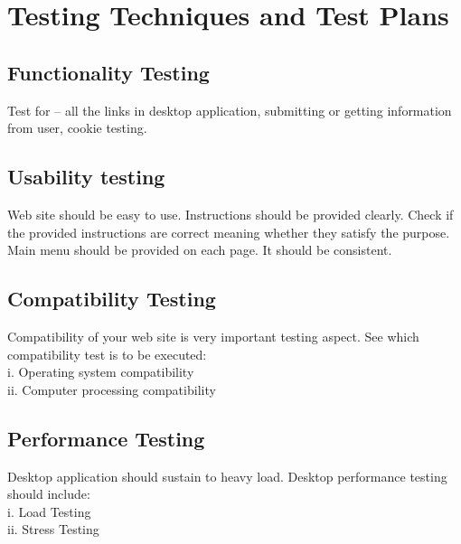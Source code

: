 	\section{Testing Techniques and Test Plans
}
\subsection{Functionality Testing}
Test for – all the links in desktop application, 
submitting or getting information from user, cookie testing.

\subsection{Usability testing}
Web site should be easy to use. Instructions should be provided clearly. Check if the provided
instructions are correct meaning whether they satisfy the purpose. Main menu should be
provided on each page. It should be consistent.


\subsection{Compatibility Testing}
Compatibility of your web site is very important testing aspect. See which compatibility test is
to be executed:
\\i. Operating system compatibility
\\ii. Computer processing compatibility

\subsection{Performance Testing}
Desktop application should sustain to heavy load. Desktop performance testing should include:
\\i. Load Testing
\\ii. Stress Testing

